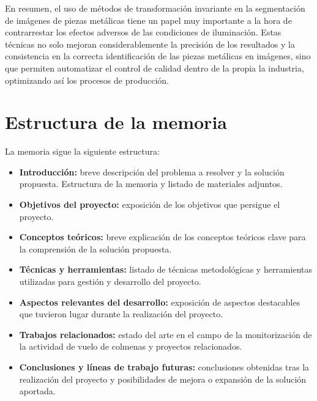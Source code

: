 En resumen, el uso de métodos de transformación invariante en la segmentación de imágenes de piezas metálicas tiene un papel muy importante a la hora de contrarrestar los efectos adversos de las condiciones de iluminación. Estas técnicas no solo mejoran considerablemente la precisión de los resultados y la consistencia en la correcta identificación de las piezas metálicas en imágenes, sino que permiten automatizar el control de calidad dentro de la propia la industria, optimizando así los procesos de producción. \cite{jmmp6060141}


%
%

\section{Estructura de la memoria}\label{estructura-de-la-memoria}

La memoria sigue la siguiente estructura:

\begin{itemize}
    \tightlist
        \item
            \textbf{Introducción:} breve descripción del problema a resolver y la solución propuesta. Estructura de la memoria y listado de materiales adjuntos.
        \item
            \textbf{Objetivos del proyecto:} exposición de los objetivos que persigue el proyecto.
        \item
            \textbf{Conceptos teóricos:} breve explicación de los conceptos teóricos clave para la comprensión de la solución propuesta.
        \item
            \textbf{Técnicas y herramientas:} listado de técnicas metodológicas y herramientas utilizadas para gestión y desarrollo del proyecto.
        \item
            \textbf{Aspectos relevantes del desarrollo:} exposición de aspectos destacables que tuvieron lugar durante la realización del proyecto.
        \item
            \textbf{Trabajos relacionados:} estado del arte en el campo de la monitorización de la actividad de vuelo de colmenas y proyectos relacionados.
        \item
            \textbf{Conclusiones y líneas de trabajo futuras:} conclusiones obtenidas tras la realización del proyecto y posibilidades de mejora o expansión de la solución aportada.
\end{itemize}


